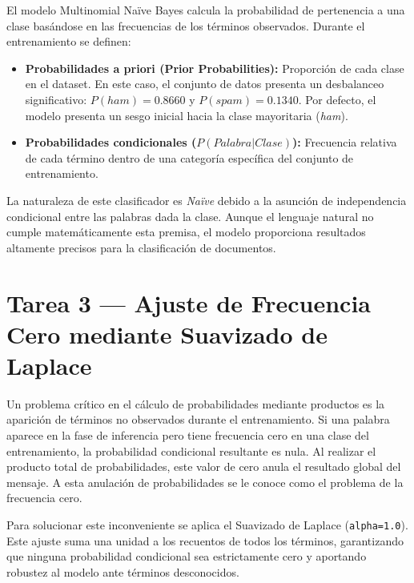 \documentclass[../../__memoria.tex]{subfiles}
\begin{document}
El modelo Multinomial Naïve Bayes calcula la probabilidad de pertenencia a una clase basándose en las frecuencias de los términos observados. Durante el entrenamiento se definen:

\begin{itemize}
    \item \textbf{Probabilidades a priori (Prior Probabilities):} Proporción de cada clase en el dataset. En este caso, el conjunto de datos presenta un desbalanceo significativo: $P(ham) = 0.8660$ y $P(spam) = 0.1340$. Por defecto, el modelo presenta un sesgo inicial hacia la clase mayoritaria (\textit{ham}).
    
    \item \textbf{Probabilidades condicionales ($P(Palabra | Clase)$):} Frecuencia relativa de cada término dentro de una categoría específica del conjunto de entrenamiento.
\end{itemize}

La naturaleza de este clasificador es \textit{Naïve} debido a la asunción de independencia condicional entre las palabras dada la clase. Aunque el lenguaje natural no cumple matemáticamente esta premisa, el modelo proporciona resultados altamente precisos para la clasificación de documentos.

\section[Tarea 3: Suavizado de Laplace]{Tarea 3 --- Ajuste de Frecuencia Cero mediante Suavizado de Laplace}

Un problema crítico en el cálculo de probabilidades mediante productos es la aparición de términos no observados durante el entrenamiento. Si una palabra aparece en la fase de inferencia pero tiene frecuencia cero en una clase del entrenamiento, la probabilidad condicional resultante es nula. Al realizar el producto total de probabilidades, este valor de cero anula el resultado global del mensaje. A esta anulación de probabilidades se le conoce como el problema de la frecuencia cero.

Para solucionar este inconveniente se aplica el Suavizado de Laplace (\texttt{alpha=1.0}). Este ajuste suma una unidad a los recuentos de todos los términos, garantizando que ninguna probabilidad condicional sea estrictamente cero y aportando robustez al modelo ante términos desconocidos.
\end{document}
